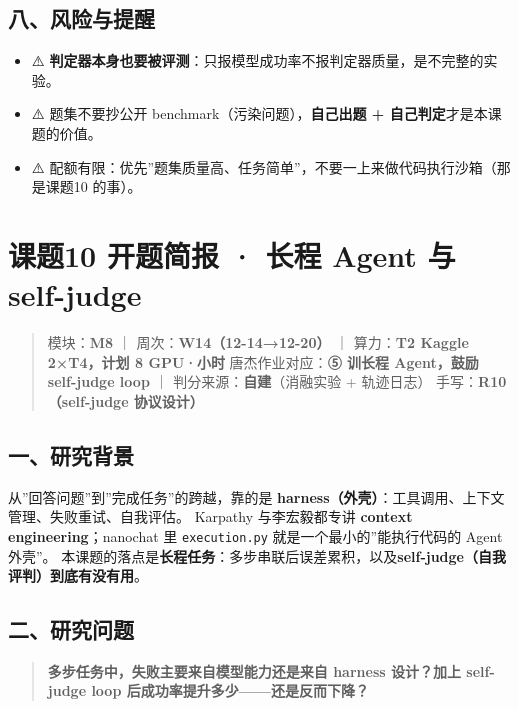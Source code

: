\documentclass[
  chinese,
  11pt,
]{ctexart}
\providecommand{\tightlist}{%
  \setlength{\itemsep}{0pt}\setlength{\parskip}{0pt}}
\begin{document}
\subsection{八、风险与提醒}\label{ux516bux98ceux9669ux4e0eux63d0ux9192-7}

\begin{itemize}
\tightlist
\item
  ⚠️ \textbf{判定器本身也要被评测}：只报模型成功率不报判定器质量，是不完整的实验。
\item
  ⚠️ 题集不要抄公开 benchmark（污染问题），\textbf{自己出题 + 自己判定}才是本课题的价值。
\item
  ⚠️ 配额有限：优先''题集质量高、任务简单''，不要一上来做代码执行沙箱（那是课题10 的事）。
\end{itemize}

\newpage

\section{课题10 开题简报 · 长程 Agent 与 self-judge}\label{ux8bfeux989810-ux5f00ux9898ux7b80ux62a5-ux957fux7a0b-agent-ux4e0e-self-judge}

\begin{quote}
模块：\textbf{M8} ｜ 周次：\textbf{W14（12-14→12-20）} ｜ 算力：\textbf{T2 Kaggle 2×T4，计划 8 GPU·小时} 唐杰作业对应：\textbf{⑤ 训长程 Agent，鼓励 self-judge loop} ｜ 判分来源：\textbf{自建}（消融实验 + 轨迹日志） 手写：\textbf{R10（self-judge 协议设计）}
\end{quote}

\subsection{一、研究背景}\label{ux4e00ux7814ux7a76ux80ccux666f-8}

从''回答问题''到''完成任务''的跨越，靠的是 \textbf{harness（外壳）}：工具调用、上下文管理、失败重试、自我评估。 Karpathy 与李宏毅都专讲 \textbf{context engineering}；nanochat 里 \texttt{execution.py} 就是一个最小的''能执行代码的 Agent 外壳''。 本课题的落点是\textbf{长程任务}：多步串联后误差累积，以及\textbf{self-judge（自我评判）到底有没有用}。

\subsection{二、研究问题}\label{ux4e8cux7814ux7a76ux95eeux9898-4}

\begin{quote}
\textbf{多步任务中，失败主要来自模型能力还是来自 harness 设计？加上 self-judge loop 后成功率提升多少------还是反而下降？}
\end{quote}
\end{document}
